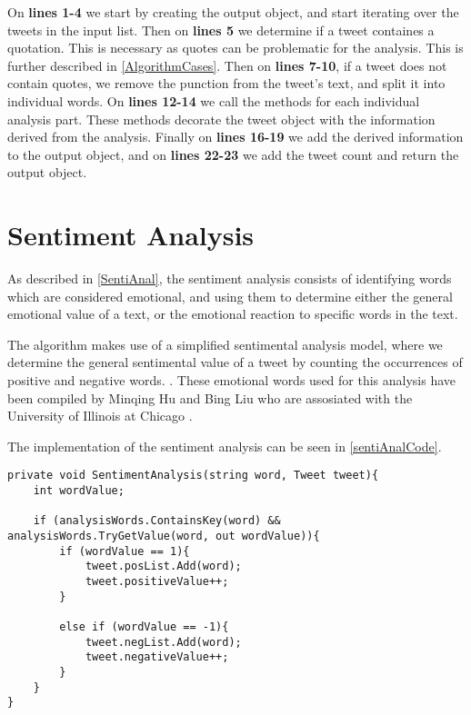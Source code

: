 On \textbf{lines 1-4} we start by creating the output object, and start
iterating over the tweets in the input list. Then on \textbf{lines 5} we
determine if a tweet containes a quotation. This is necessary as quotes can be
problematic for the analysis. This is further described in
\autoref{AlgorithmCases}. Then on \textbf{lines 7-10}, if a tweet does not
contain quotes, we remove the punction from the tweet's text, and split it into
individual words. On \textbf{lines 12-14} we call the methods for each
individual analysis part. These methods decorate the tweet object with the
information derived from the analysis. Finally on \textbf{lines 16-19} we add
the derived information to the output object, and on \textbf{lines 22-23} we add
the tweet count and return the output object.

\section{Sentiment Analysis}
As described in \autoref{SentiAnal}, the sentiment analysis consists of
identifying words which are considered emotional, and using them to determine
either the general emotional value of a text, or the emotional reaction to
specific words in the text.\nl

The algorithm makes use of a simplified sentimental analysis model, where we
determine the general sentimental value of a tweet by counting the occurrences
of positive and negative words. . These emotional words used for this
analysis have been compiled by Minqing Hu and Bing Liu who are assosiated with
the University of Illinois at Chicago \citep{Hu:2004:MSC:1014052.1014073}.\nl

The implementation of the sentiment analysis can be seen in
\autoref{sentiAnalCode}.\\

\begin{minipage}[H]{\linewidth}
\begin{lstlisting}[caption = Determining the sentiment of a tweet , label = sentiAnalCode] 
private void SentimentAnalysis(string word, Tweet tweet){
	int wordValue;

    if (analysisWords.ContainsKey(word) && analysisWords.TryGetValue(word, out wordValue)){
    	if (wordValue == 1){
        	tweet.posList.Add(word);
            tweet.positiveValue++;
        }

        else if (wordValue == -1){
        	tweet.negList.Add(word);
            tweet.negativeValue++;
        }
    }
}
\end{lstlisting}
\end{minipage}

